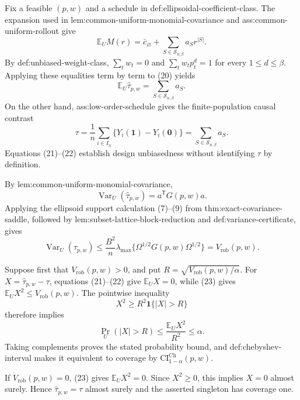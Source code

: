 Fix a feasible \((p,w)\) and a schedule in def:ellipsoidal-coefficient-class.  The expansion used in lem:common-uniform-monomial-covariance and ass:common-uniform-rollout give
\[
\mathbb E_U M(r)=\bar c_{\varnothing}
+\sum_{S\in\mathcal S_{n,\beta}}a_Sr^{|S|}.
\tag{20}
\]
By def:unbiased-weight-class, \(\sum_tw_t=0\) and
\(\sum_tw_tp_t^d=1\) for every \(1\le d\le\beta\).  Applying these equalities term by term to (20) yields
\[
\mathbb E_U\widehat\tau_{p,w}
=\sum_{S\in\mathcal S_{n,\beta}}a_S.
\tag{21}
\]
On the other hand, ass:low-order-schedule gives the finite-population causal contrast
\[
\tau
=\frac1n\sum_{i\in I_n}\{Y_i(\mathbf1)-Y_i(\mathbf0)\}
=\sum_{S\in\mathcal S_{n,\beta}}a_S.
\tag{22}
\]
Equations (21)--(22) establish design unbiasedness without identifying \(\tau\) by definition.

By lem:common-uniform-monomial-covariance,
\[
\operatorname{Var}_U(\widehat\tau_{p,w})=a^{\mathsf T}G(p,w)a.
\]
Applying the ellipsoid support calculation (7)--(9) from thm:exact-covariance-saddle, followed by lem:subset-lattice-block-reduction and def:variance-certificate, gives
\[
\operatorname{Var}_U(\widehat\tau_{p,w})
\le\frac{B^2}{n}\lambda_{\max}\{\Omega^{1/2}G(p,w)\Omega^{1/2}\}
=V_{\mathrm{rob}}(p,w).
\tag{23}
\]

Suppose first that \(V_{\mathrm{rob}}(p,w)>0\), and put
\(R=\sqrt{V_{\mathrm{rob}}(p,w)/\alpha}\).  For
\(X=\widehat\tau_{p,w}-\tau\), equations (21)--(22) give \(\mathbb E_UX=0\), while (23) gives \(\mathbb E_UX^2\le V_{\mathrm{rob}}(p,w)\).  The pointwise inequality
\[
X^2\ge R^2\mathbf1\{|X|>R\}
\]
therefore implies
\[
\Pr_U(|X|>R)
\le\frac{\mathbb E_UX^2}{R^2}
\le\alpha.
\]
Taking complements proves the stated probability bound, and def:chebyshev-interval makes it equivalent to coverage by \(\mathrm{CI}^{\mathrm{Ch}}_{1-\alpha}(p,w)\).

If \(V_{\mathrm{rob}}(p,w)=0\), (23) gives \(\mathbb E_UX^2=0\).  Since \(X^2\ge0\), this implies \(X=0\) almost surely.  Hence \(\widehat\tau_{p,w}=\tau\) almost surely and the asserted singleton has coverage one.